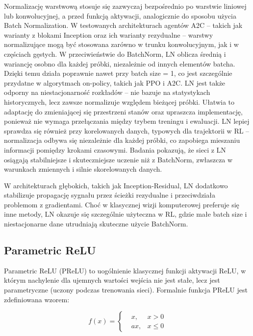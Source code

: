 Normalizację warstwową stosuje się zazwyczaj bezpośrednio po warstwie liniowej lub konwolucyjnej, a przed funkcją aktywacji, analogicznie do sposobu użycia Batch Normalization. W testowanych architekturach agentów A2C – takich jak warianty z blokami Inception oraz ich warianty rezydualne – warstwy normalizujące mogą być stosowana zarówno w trunku konwolucyjnym, jak i w częściach gęstych. W przeciwieństwie do BatchNorm, LN oblicza średnią i wariancję osobno dla każdej próbki, niezależnie od innych elementów batcha. Dzięki temu działa poprawnie nawet przy batch size = 1, co jest szczególnie przydatne w algorytmach on-policy, takich jak PPO i A2C. 
LN jest także odporny na niestacjonarność rozkładów – nie bazuje na statystykach historycznych, lecz zawsze normalizuje względem bieżącej próbki. Ułatwia to adaptację do zmieniającej się przestrzeni stanów oraz upraszcza implementację, ponieważ nie wymaga przełączania między trybem treningu i ewaluacji. LN lepiej sprawdza się również przy korelowanych danych, typowych dla trajektorii w RL – normalizacja odbywa się niezależnie dla każdej próbki, co zapobiega mieszaniu informacji pomiędzy krokami czasowymi. Badania pokazują, że sieci z LN osiągają stabilniejsze i skuteczniejsze uczenie niż z BatchNorm, zwłaszcza w warunkach zmiennych i silnie skorelowanych danych.

W architekturach głębokich, takich jak Inception-Residual, LN dodatkowo stabilizuje propagację sygnału przez ścieżki rezydualne i przeciwdziała problemom z gradientami. Choć w klasycznej wizji komputerowej preferuje się inne metody, LN okazuje się szczególnie użyteczna w RL, gdzie małe batch size i niestacjonarne dane utrudniają skuteczne użycie BatchNorm.

\subsection*{Parametric ReLU}
Parametric ReLU (PReLU) to uogólnienie klasycznej funkcji aktywacji ReLU, w którym nachylenie dla ujemnych wartości wejścia nie jest stałe, lecz jest parametryczne (uczony podczas trenowania sieci). Formalnie funkcja PReLU jest zdefiniowana wzorem:


\begin{equation}
		f(x)=
		\left  \{ \begin{aligned} 
		&x, &x > 0 \\
		&ax, &x \leq 0
		\end{aligned} \right.
\end{equation}

